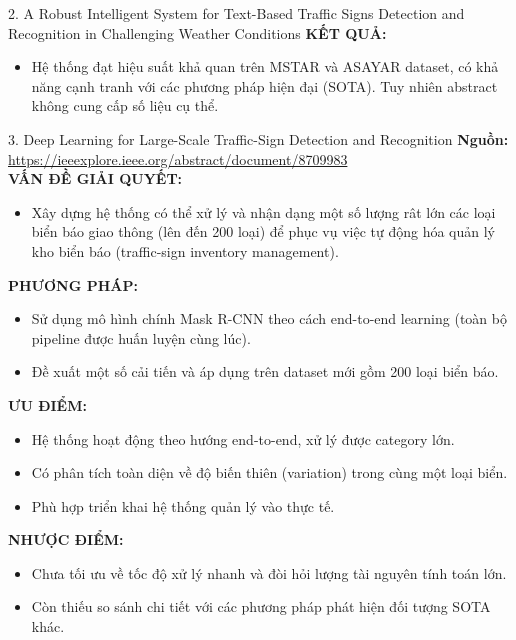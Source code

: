 \documentclass[12pt,a4paper]{article}
\newcommand{\subheading}[1]{\vspace{0.3cm}\noindent\textbf{\textcolor{primary}{\MakeUppercase{#1}:}}\par\vspace{0.1cm}}
\begin{document}
\begin{paperbox}{2. A Robust Intelligent System for Text-Based Traffic Signs Detection and Recognition in Challenging Weather Conditions}
    \subheading{Kết quả}
    \begin{itemize}
        \item Hệ thống đạt hiệu suất khả quan trên MSTAR và ASAYAR dataset, có khả năng cạnh tranh với các phương pháp hiện đại (SOTA). Tuy nhiên abstract không cung cấp số liệu cụ thể.
    \end{itemize}
\end{paperbox}

\vspace{0.5cm}

\begin{paperbox}{3. Deep Learning for Large-Scale Traffic-Sign Detection and Recognition}
    \textbf{Nguồn:} \url{https://ieeexplore.ieee.org/abstract/document/8709983}\\

    \subheading{Vấn đề giải quyết}
    \begin{itemize}
        \item Xây dựng hệ thống có thể xử lý và nhận dạng một số lượng rât lớn các loại biển báo giao thông (lên đến 200 loại) để phục vụ việc tự động hóa quản lý kho biển báo (traffic-sign inventory management).
    \end{itemize}

    \subheading{Phương pháp}
    \begin{itemize}
        \item Sử dụng mô hình chính Mask R-CNN theo cách end-to-end learning (toàn bộ pipeline được huấn luyện cùng lúc).
        \item Đề xuất một số cải tiến và áp dụng trên dataset mới gồm 200 loại biển báo.
    \end{itemize}

    \subheading{Ưu điểm}
    \begin{itemize}
        \item Hệ thống hoạt động theo hướng end-to-end, xử lý được category lớn.
        \item Có phân tích toàn diện về độ biến thiên (variation) trong cùng một loại biển.
        \item Phù hợp triển khai hệ thống quản lý vào thực tế.
    \end{itemize}

    \subheading{Nhược điểm}
    \begin{itemize}
        \item Chưa tối ưu về tốc độ xử lý nhanh và đòi hỏi lượng tài nguyên tính toán lớn.
        \item Còn thiếu so sánh chi tiết với các phương pháp phát hiện đối tượng SOTA khác.
    \end{itemize}


\end{paperbox}
\end{document}
